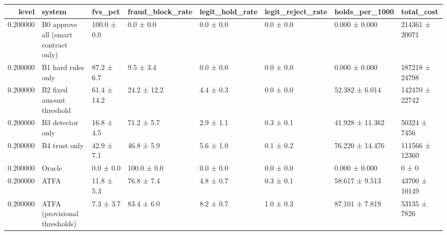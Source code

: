 \begin{tabular}{rlllllll}
\toprule
level & system & fvs\_pct & fraud\_block\_rate & legit\_hold\_rate & legit\_reject\_rate & holds\_per\_1000 & total\_cost \\
\midrule
0.200000 & B0 approve all (smart contract only) & 100.0 ± 0.0 & 0.0 ± 0.0 & 0.0 ± 0.0 & 0.0 ± 0.0 & 0.000 ± 0.000 & 214361 ± 20071 \\
0.200000 & B1 hard rules only & 87.2 ± 6.7 & 9.5 ± 3.4 & 0.0 ± 0.0 & 0.0 ± 0.0 & 0.000 ± 0.000 & 187218 ± 24798 \\
0.200000 & B2 fixed amount threshold & 61.4 ± 14.2 & 24.2 ± 12.2 & 4.4 ± 0.3 & 0.0 ± 0.0 & 52.382 ± 6.014 & 142470 ± 22742 \\
0.200000 & B3 detector only & 16.8 ± 4.5 & 71.2 ± 5.7 & 2.9 ± 1.1 & 0.3 ± 0.1 & 41.928 ± 11.362 & 50324 ± 7456 \\
0.200000 & B4 trust only & 42.9 ± 7.1 & 46.8 ± 5.9 & 5.6 ± 1.0 & 0.1 ± 0.2 & 76.220 ± 14.476 & 111566 ± 12360 \\
0.200000 & Oracle & 0.0 ± 0.0 & 100.0 ± 0.0 & 0.0 ± 0.0 & 0.0 ± 0.0 & 0.000 ± 0.000 & 0 ± 0 \\
0.200000 & ATFA & 11.8 ± 5.3 & 76.8 ± 7.4 & 4.8 ± 0.7 & 0.3 ± 0.1 & 58.617 ± 9.513 & 43700 ± 10149 \\
0.200000 & ATFA (provisional thresholds) & 7.3 ± 3.7 & 83.4 ± 6.0 & 8.2 ± 0.7 & 1.0 ± 0.3 & 87.101 ± 7.819 & 53135 ± 7826 \\
\bottomrule
\end{tabular}
